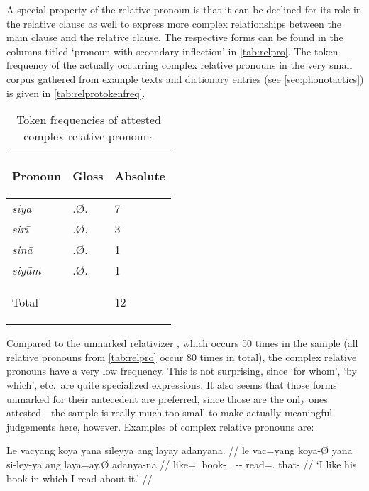 A special property of the relative pronoun is that it can be declined for its 
role in the relative clause as well to express more complex relationships 
between the main clause and the relative clause. The respective forms can be 
found in the columns titled `pronoun with secondary inflection' in 
\autoref{tab:relpro}. The token frequency of the actually occurring complex 
relative pronouns in the very small corpus gathered from example texts and 
dictionary entries (see \autoref{sec:phonotactics}) is given in 
\autoref{tab:relprotokenfreq}.

\begin{table}[tp]\centering
\caption{Token frequencies of attested complex relative pronouns}

\begin{tabu} to .75
\tableheaderfont\toprule

Pronoun & Gloss & Absolute \\

\toprule

siyā	& \Rel{}.Ø.\Loc{} & 7 \\
sirī	& \Rel{}.Ø.\Ins{} & 3 \\
sinā	& \Rel{}.Ø.\Gen{} & 1 \\
siyām	& \Rel{}.Ø.\Dat{} & 1 \\

\bottomrule

\textup{Total}	& & 12 \\

\bottomrule
\end{tabu}
\label{tab:relprotokenfreq}
\end{table}

Compared to the unmarked relativizer , which occurs 50 times in 
the sample (all relative pronouns from \autoref{tab:relpro} occur 80 times in 
total), the complex relative pronouns have a very low frequency. This is not 
surprising, since `for whom', `by which', etc.\ are quite specialized 
expressions. It also seems that those forms unmarked for their antecedent are 
preferred, since those are the only ones attested---the sample is really much 
too small to make actually meaningful judgements here, however. Examples of 
complex relative pronouns are:

\pex
\a\begingl[glspace=.33em]
	\gla Le vacyang koya yana sileyya ang layāy adanyana. //
	\glb le vac=yang koya-Ø yana si-ley-ya ang laya=ay.Ø adanya-na //
	\glc \PatTI{} like=\Fsg{}.\Aarg{} book-\Top{} \TsgM{}.\Gen{} 
		\Rel{}-\PargI{}-\Loc{} \Aarg{} read=\Fsg{}.\Top{} that-\Gen{} //
	\glft `I like his book in which I read about it.' //
\endgl

